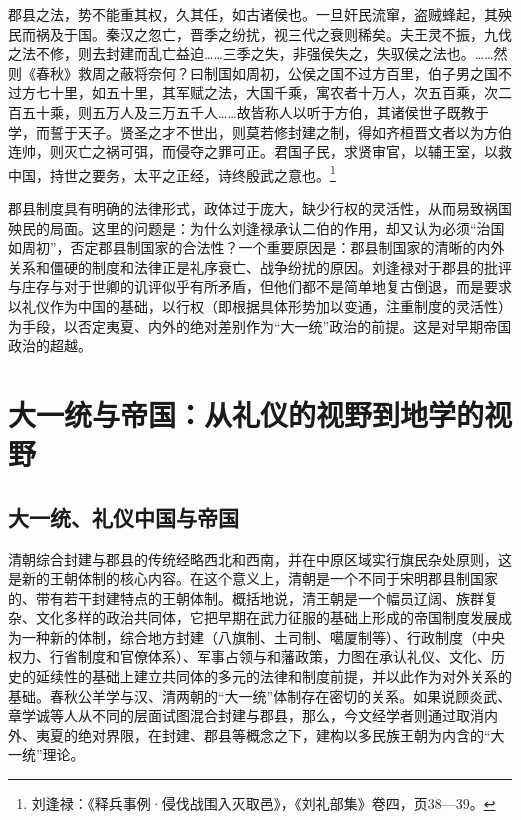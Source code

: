 \documentclass[a4paper, 12pt, openright]{ctexbook}
\renewenvironment{quote}
  {\list{}{\rightmargin2\ccwd \leftmargin2\ccwd \itemindent=2\ccwd \listparindent=2\ccwd}%
   \item\relax\small\kaishu\color{black}}
  {\endlist}
\begin{document}
\begin{quote}
郡县之法，势不能重其权，久其任，如古诸侯也。一旦奸民流窜，盗贼蜂起，其殃民而祸及于国。秦汉之忽亡，晋季之纷扰，视三代之衰则稀矣。夫王灵不振，九伐之法不修，则去封建而乱亡益迫……三季之失，非强侯失之，失驭侯之法也。……然则《春秋》救周之蔽将奈何？曰制国如周初，公侯之国不过方百里，伯子男之国不过方七十里，如五十里，其军赋之法，大国千乘，寓农者十万人，次五百乘，次二百五十乘，则五万人及三万五千人……故皆称人以听于方伯，其诸侯世子既教于学，而誓于天子。贤圣之才不世出，则莫若修封建之制，得如齐桓晋文者以为方伯连帅，则灭亡之祸可弭，而侵夺之罪可正。君国子民，求贤审官，以辅王室，以救中国，持世之要务，太平之正经，诗终殷武之意也。\footnote{刘逢禄：《释兵事例·侵伐战围入灭取邑》，《刘礼部集》卷四，页38—39。}
\end{quote}

郡县制度具有明确的法律形式，政体过于庞大，缺少行权的灵活性，从而易致祸国殃民的局面。这里的问题是：为什么刘逢禄承认二伯的作用，却又认为必须“治国如周初”，否定郡县制国家的合法性？一个重要原因是：郡县制国家的清晰的内外关系和僵硬的制度和法律正是礼序衰亡、战争纷扰的原因。刘逢禄对于郡县的批评与庄存与对于世卿的讥评似乎有所矛盾，但他们都不是简单地复古倒退，而是要求以礼仪作为中国的基础，以行权（即根据具体形势加以变通，注重制度的灵活性）为手段，以否定夷夏、内外的绝对差别作为“大一统”政治的前提。这是对早期帝国政治的超越。

\section{大一统与帝国：从礼仪的视野到地学的视野}

\subsection{大一统、礼仪中国与帝国}

清朝综合封建与郡县的传统经略西北和西南，并在中原区域实行旗民杂处原则，这是新的王朝体制的核心内容。在这个意义上，清朝是一个不同于宋明郡县制国家的、带有若干封建特点的王朝体制。概括地说，清王朝是一个幅员辽阔、族群复杂、文化多样的政治共同体，它把早期在武力征服的基础上形成的帝国制度发展成为一种新的体制，综合地方封建（八旗制、土司制、噶厦制等）、行政制度（中央权力、行省制度和官僚体系）、军事占领与和藩政策，力图在承认礼仪、文化、历史的延续性的基础上建立共同体的多元的法律和制度前提，并以此作为对外关系的基础。春秋公羊学与汉、清两朝的“大一统”体制存在密切的关系。如果说顾炎武、章学诚等人从不同的层面试图混合封建与郡县，那么，今文经学者则通过取消内外、夷夏的绝对界限，在封建、郡县等概念之下，建构以多民族王朝为内含的“大一统”理论。
\end{document}

